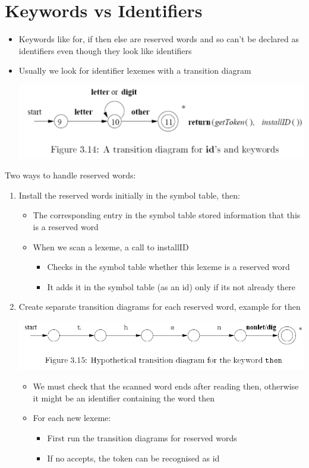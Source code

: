 \documentclass{article}[18pt]
\begin{document}
\section{Keywords vs Identifiers}
\begin{itemize}
	\item Keywords like for, if then else are reserved words and so can't be declared as identifiers even though they look like identifiers
	\item Usually we look for identifier lexemes with a transition diagram
	\begin{center}
		\includegraphics[scale=0.4]{lexemes}
	\end{center}
	
\end{itemize}
Two ways to handle reserved words:
\begin{enumerate}
	\item Install the reserved words initially in the symbol table, then:
	\begin{itemize}
		\item The corresponding entry in the symbol table stored information that this is a reserved word
		\item When we scan a lexeme, a call to installID
		\begin{itemize}
			\item Checks in the symbol table whether this lexeme is a reserved word
			\item It adds it in the symbol table (as an id) only if its not already there
		\end{itemize}
	\end{itemize}
	\item Create separate transition diagrams for each reserved word, example for then
	\begin{center}
		\includegraphics[scale=0.4]{"reserved word"}
	\end{center}
	\begin{itemize}
		\item We must check that the scanned word ends after reading then, otherwise it might be an identifier containing the word then
		\item For each new lexeme:
		\begin{itemize}
			\item First run the transition diagrams for reserved words
			\item If no accepts, the token can be recognised as id
		\end{itemize}
	\end{itemize}
		
\end{enumerate}
\end{document}

